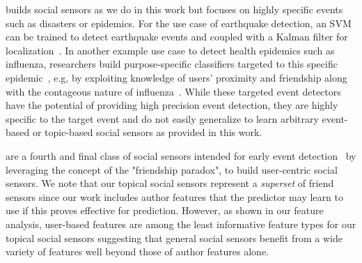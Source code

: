 \vspace{2mm}
 builds social sensors
as we do in this work but focuses on highly specific events 
such as disasters or epidemics.  For the use case of earthquake
detection, an SVM can be trained to detect earthquake events
and coupled with a Kalman filter for localization~\citep{sakakiEq2}.
%
%
%
In another example use case to detect health epidemics such as
influenza, researchers build purpose-specific classifiers targeted to
this specific epidemic~\citep{culotta,aramaki}, e.g, by exploiting
knowledge of users' proximity and friendship along with the contageous
nature of influenza~\citep{sadilek}.  While these targeted event
detectors have the potential of providing high precision event
detection, they are highly specific to the target event and do not
easily generalize to learn arbitrary event-based or topic-based social
sensors as provided in this work.

\vspace{2mm}
are a fourth and final class of social sensors intended for early
event detection~\citep{sandy,garcia} by leveraging the concept of the
"friendship paradox"\citep{feld}, %
to build user-centric social sensors.  We note that our topical social
sensors represent a \emph{superset} of friend sensors since our work
includes author features that the predictor may learn to use if this
proves effective for prediction.  However, as shown in our feature
analysis, user-based features are among the least informative feature
types for our topical social sensors suggesting that general social
sensors benefit from a wide variety of features well beyond those of
author features alone.

